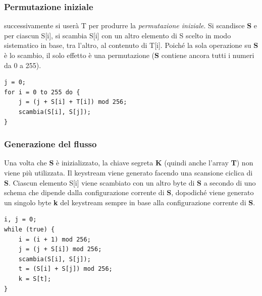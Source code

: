\subsubsection{Permutazione iniziale}
successivamente si userà T per produrre la \textit{permutazione iniziale}. Si scandisce \textbf{S} e per ciascun S[i], si scambia S[i] con un altro elemento di S scelto in modo sistematico in base, tra l'altro, al contenuto di T[i]. Poiché la sola operazione su \textbf{S} è lo scambio, il solo effetto è una permutazione (\textbf{S} contiene ancora tutti i numeri da 0 a 255).

\begin{algorithm}
\begin{lstlisting}[caption={Permutazione iniziale RC4}]
j = 0;
for i = 0 to 255 do {
	j = (j + S[i] + T[i]) mod 256;
	scambia(S[i], S[j]);
}
\end{lstlisting}
\end{algorithm}

\subsubsection{Generazione del flusso}
Una volta che \textbf{S} è inizializzato, la chiave segreta \textbf{K} (quindi anche l'array \textbf{T}) non viene più utilizzata. Il keystream viene generato facendo una
scansione ciclica di \textbf{S}. Ciascun elemento S[i] viene scambiato con un altro byte di \textbf{S} a secondo di uno schema che dipende dalla configurazione corrente di \textbf{S}, dopodiché viene generato un singolo byte \textbf{k} del keystream sempre in base alla configurazione corrente di \textbf{S}.

\begin{algorithm}
\begin{lstlisting}[caption={Generazione flusso}]
i, j = 0;
while (true) {
	i = (i + 1) mod 256;
	j = (j + S[i]) mod 256;
	scambia(S[i], S[j]);
	t = (S[i] + S[j]) mod 256;
	k = S[t];
}
\end{lstlisting}
\end{algorithm}
